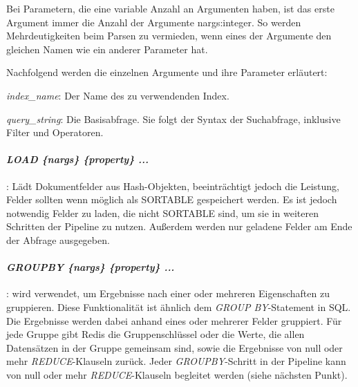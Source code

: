 Bei Parametern, die eine variable Anzahl an Argumenten haben, ist das erste Argument immer die Anzahl der Argumente {nargs:integer}. So werden Mehrdeutigkeiten beim Parsen zu vermieden, wenn eines der Argumente den gleichen Namen wie ein anderer Parameter hat.

Nachfolgend werden die einzelnen Argumente und ihre Parameter erläutert:

\emph{index\_name}: Der Name des zu verwendenden Index.

\emph{query\_string}: Die Basisabfrage. Sie folgt der Syntax der Suchabfrage, inklusive Filter und Operatoren.

\paragraph{\emph{LOAD \{nargs\} \{property\} ...}}: Lädt Dokumentfelder aus Hash-Objekten, beeinträchtigt jedoch die Leistung, Felder sollten wenn möglich als SORTABLE gespeichert werden. Es ist jedoch notwendig Felder zu laden, die nicht SORTABLE sind, um sie in weiteren Schritten der Pipeline zu nutzen. Außerdem werden nur geladene Felder am Ende der Abfrage ausgegeben.

\paragraph{\emph{GROUPBY \{nargs\} \{property\} ...}}: wird verwendet, um Ergebnisse nach einer oder mehreren Eigenschaften zu gruppieren. Diese Funktionalität ist ähnlich dem \emph{GROUP BY}-Statement in SQL. Die Ergebnisse werden dabei anhand eines oder mehrerer Felder gruppiert. Für jede Gruppe gibt Redis die Gruppenschlüssel oder die Werte, die allen Datensätzen in der Gruppe gemeinsam sind, sowie die Ergebnisse von null oder mehr \emph{REDUCE}-Klauseln zurück. Jeder \emph{GROUPBY}-Schritt in der Pipeline kann von null oder mehr \emph{REDUCE}-Klauseln begleitet werden (siehe nächsten Punkt).

